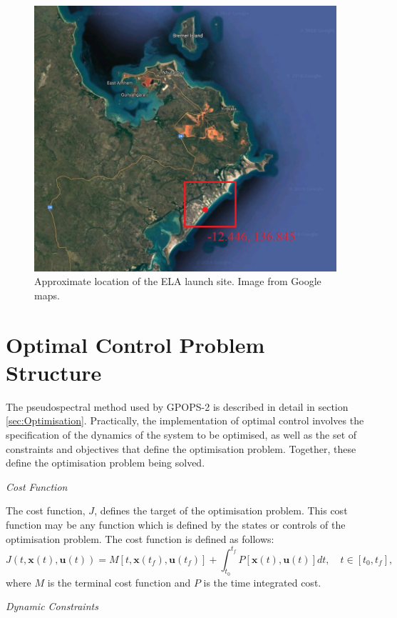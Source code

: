 \begin{figure}[ht]
\centering
\includegraphics[width=0.7\linewidth]{figures/4_LODESTAR/SiteLocation}
\caption{Approximate location of the ELA launch site. Image from Google maps.}
\label{fig:SiteLocation}
\end{figure}


\section{Optimal Control Problem Structure}

The pseudospectral method used by GPOPS-2 is described in detail in section \ref{sec:Optimisation}. Practically, the implementation of optimal control involves the specification of the dynamics of the system to be optimised, as well as the set of constraints and objectives that define the optimisation problem. 
 Together, these define the optimisation problem being solved.

\noindent \textit{Cost Function}

\noindent The cost function, $J$, defines the target of the optimisation problem. 
This cost function may be any function which is defined by the states or controls of the optimisation problem. The cost function is defined as follows:
\begin{equation} \label{eq:cost}
J(t,\textbf{x}(t),\textbf{u}(t)) = M[t,\textbf{x}(t_f),\textbf{u}(t_f)] +   \int_{t_0}^{t_f} P[\textbf{x}(t),\textbf{u}(t)] dt, \quad t \in [t_0,t_f],
\end{equation}
where $M$ is the terminal cost function and $P$ is the time integrated cost. 

\noindent \textit{Dynamic Constraints}

